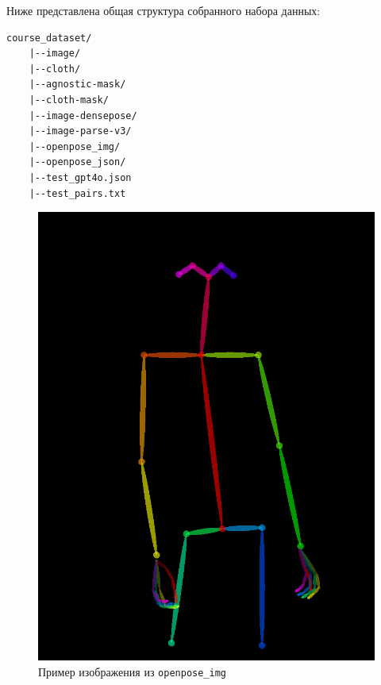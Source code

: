 Ниже представлена общая структура собранного набора данных:
\begin{verbatim}
course_dataset/
    |--image/
    |--cloth/
    |--agnostic-mask/
    |--cloth-mask/
    |--image-densepose/
    |--image-parse-v3/
    |--openpose_img/
    |--openpose_json/
    |--test_gpt4o.json
    |--test_pairs.txt
\end{verbatim}

\begin{figure}[H]
    \centering
    \includegraphics[width=0.55\linewidth]{images/practice_openpose.png}
    \caption{Пример изображения из \texttt{openpose\_img}}
    \label{fig:practice_openpose}
\end{figure}
